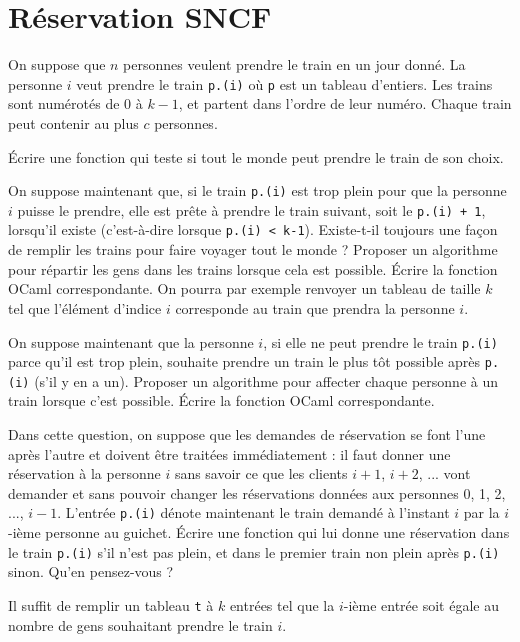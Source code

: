 \renewcommand{\SourceFile}{3-strategies-gloutonnes/src/3-1.ml}

\section{Réservation SNCF}

On suppose que $n$ personnes veulent prendre le train en un jour donné. La personne $i$ veut prendre le train \texttt{p.(i)} où \texttt{p} est un tableau d'entiers. Les trains sont numérotés de 0 à $k-1$, et partent dans l'ordre de leur numéro. Chaque train peut contenir au plus $c$ personnes.

\Q
Écrire une fonction qui teste si tout le monde peut prendre le train de son choix.

\Q
On suppose maintenant que, si le train \texttt{p.(i)} est trop plein pour que la personne $i$ puisse le prendre, elle est prête à prendre le train suivant, soit le \texttt{p.(i) + 1}, lorsqu'il existe (c'est-à-dire lorsque \texttt{p.(i) < k-1}). Existe-t-il toujours une façon de remplir les trains pour faire voyager tout le monde ? Proposer un algorithme pour répartir les gens dans les trains lorsque cela est possible. Écrire la fonction OCaml correspondante. On pourra par exemple renvoyer un tableau de taille $k$ tel que l'élément d'indice $i$ corresponde au train que prendra la personne $i$.

\Q
On suppose maintenant que la personne $i$, si elle ne peut prendre le train \texttt{p.(i)} parce qu'il est trop plein, souhaite prendre un train le plus tôt possible après \texttt{p.(i)} (s'il y en a un). Proposer un algorithme pour affecter chaque personne à un train lorsque c'est possible. Écrire la fonction OCaml correspondante.

\Q
Dans cette question, on suppose que les demandes de réservation se font l'une après l'autre et doivent être traitées immédiatement : il faut donner une réservation à la personne $i$ sans savoir ce que les clients $i+1$, $i+2$, ... vont demander et sans pouvoir changer les réservations données aux personnes 0, 1, 2, ..., $i-1$. L'entrée \texttt{p.(i)} dénote maintenant le train demandé à l'instant $i$ par la $i$-ième personne au guichet. Écrire une fonction qui lui donne une réservation dans le train \texttt{p.(i)} s'il n'est pas plein, et dans le premier train non plein après \texttt{p.(i)} sinon. Qu'en pensez-vous ?

\Corrige

\Q
Il suffit de remplir un tableau \texttt{t} à $k$ entrées tel que la $i$-ième entrée soit égale au nombre de gens souhaitant prendre le train $i$.


